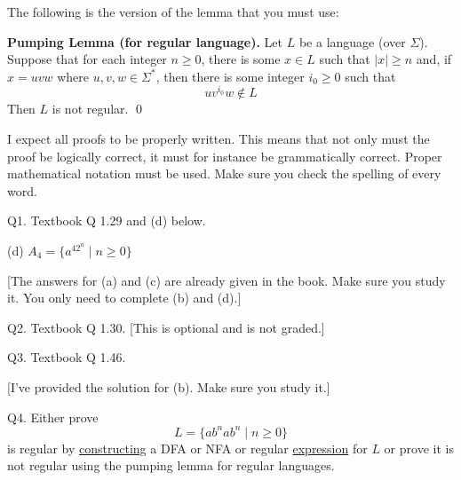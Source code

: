 



\renewcommand\TITLE{Assignment 20}
\renewcommand\AUTHOR{John Doe}
\renewcommand\EMAIL{jdoe@jdoe.com}


\topmatter


The following is the version of the lemma that you must use:


{\bf Pumping Lemma (for regular language).}
Let $L$ be a language (over $\Sigma$).
Suppose that for each integer $n \geq 0$, there is some 
$x \in L$ such that $|x| \geq n$ and, 
if $x = uvw$ where $u,v,w \in \Sigma^*$, then
there is some integer $i_0 \geq 0$ such that
\[
uv^{i_0}w \not\in L
\]
Then $L$ is not regular. \qed

I expect all proofs to be properly written.
This means that not only must the proof be logically correct,
it must for instance be grammatically correct.
Proper mathematical notation must be used.
Make sure you check the spelling of every word.

\newpage


Q1. Textbook Q 1.29 and (d) below.

(d) $A_4 = \{ a^{42^n} \mid n \geq 0 \}$

[The answers for (a) and (c) are already given in the book.
Make sure you study it.
You only need to complete (b) and (d).]

\SOLUTION

 \newpage

 \newpage

 \newpage

 \newpage

\newpage




Q2. Textbook Q 1.30.
[This is optional and is not graded.]


\newpage




Q3. Textbook Q 1.46.

[I've provided the solution for (b). Make sure you study it.]

 \newpage
 \newpage
 \newpage
 \newpage


Q4. Either prove 
\[
L = \{ab^nab^n \mid n \geq 0 \}
\]
is regular by 
\underline{constructing}
a DFA or NFA or regular \underline{expression}
 for $L$
or prove it is not regular using the pumping lemma for regular languages.


